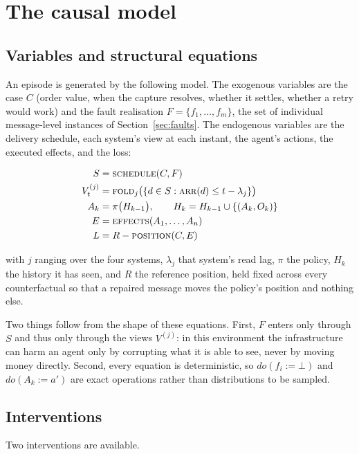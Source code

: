 \documentclass[conference]{IEEEtran}
\begin{document}
\section{The causal model}
\label{sec:scm}

\subsection{Variables and structural equations}

An episode is generated by the following model. The exogenous variables are the
case $C$ (order value, when the capture resolves, whether it settles, whether a
retry would work) and the fault realisation $F = \{f_1,\dots,f_m\}$, the set of
individual message-level instances of Section~\ref{sec:faults}. The endogenous
variables are the delivery schedule, each system's view at each instant, the
agent's actions, the executed effects, and the loss:

\begin{align}
S      &= \textsc{schedule}(C, F) \\
V_t^{(j)} &= \textsc{fold}_j\bigl(\{d \in S : \textsc{arr}(d) \le t - \lambda_j\}\bigr) \\
A_k    &= \pi\bigl(H_{k-1}\bigr), \qquad H_k = H_{k-1} \cup \{(A_k, O_k)\} \\
E      &= \textsc{effects}(A_1,\dots,A_n) \\
L      &= R - \textsc{position}(C, E)
\end{align}

with $j$ ranging over the four systems, $\lambda_j$ that system's read lag, $\pi$
the policy, $H_k$ the history it has seen, and $R$ the reference position, held
fixed across every counterfactual so that a repaired message moves the policy's
position and nothing else.

Two things follow from the shape of these equations. First, $F$ enters only
through $S$ and thus only through the views $V^{(j)}$: in this environment the
infrastructure can harm an agent only by corrupting what it is able to see,
never by moving money directly. Second, every equation is deterministic, so
$do(f_i := \bot)$ and $do(A_k := a')$ are exact operations rather than
distributions to be sampled.

\subsection{Interventions}

Two interventions are available.
\end{document}
